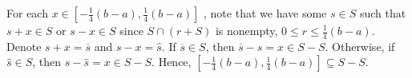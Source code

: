 \documentclass[a4paper]{article}
\begin{document}
\begin{solution}[22]
\begin{enumerate}
	For each \(x \in \left[ -\frac{1}{4}\left( b-a \right) , \frac{1}{4}\left( b-a \right)   \right] \) , note that we have some \(s \in S\) such that \(s + x \in S \) or \(s - x \in S\) since \(S \cap \left( r + S \right) \) is nonempty, \(0 \le r \le \frac{1}{4}\left( b-a \right) \). Denote \(s + x = \overline{s}\) and \(s - x = \hat{s}\). If \(\overline{s} \in S\), then \(\overline{s} - s = x \in S - S\). Otherwise, if \(\hat{s} \in S\), then \(s - \hat{s} = x \in S - S\). Hence, \(\left[ -\frac{1}{4} \left( b-a \right) , \frac{1}{4}\left( b-a \right) \right] \subseteq S - S\).
\end{enumerate}
\end{solution}
\end{document}
